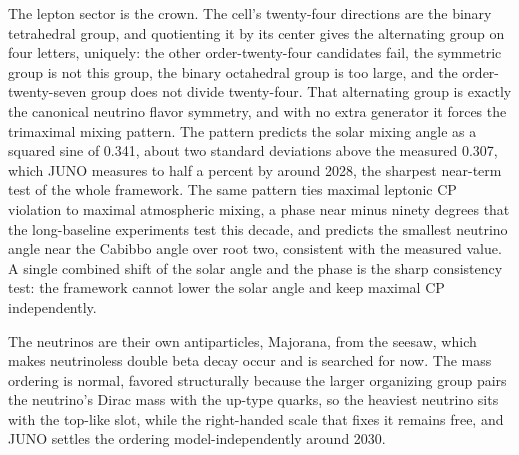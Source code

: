 The lepton sector is the crown. The cell's twenty-four directions are the binary tetrahedral group, and quotienting it
by its center gives the alternating group on four letters, uniquely: the other order-twenty-four candidates fail, the
symmetric group is not this group, the binary octahedral group is too large, and the order-twenty-seven group does not
divide twenty-four. That alternating group is exactly the canonical neutrino flavor symmetry, and with no extra
generator it forces the trimaximal mixing pattern. The pattern predicts the solar mixing angle as a squared sine of
0.341, about two standard deviations above the measured 0.307, which JUNO measures to half a percent by around 2028, the
sharpest near-term test of the whole framework. The same pattern ties maximal leptonic CP violation to maximal
atmospheric mixing, a phase near minus ninety degrees that the long-baseline experiments test this decade, and predicts
the smallest neutrino angle near the Cabibbo angle over root two, consistent with the measured value. A single combined
shift of the solar angle and the phase is the sharp consistency test: the framework cannot lower the solar angle and
keep maximal CP independently.

The neutrinos are their own antiparticles, Majorana, from the seesaw, which makes neutrinoless double beta decay occur
and is searched for now. The mass ordering is normal, favored structurally because the larger organizing group pairs
the neutrino's Dirac mass with the up-type quarks, so the heaviest neutrino sits with the top-like slot, while the
right-handed scale that fixes it remains free, and JUNO settles the ordering model-independently around 2030.
